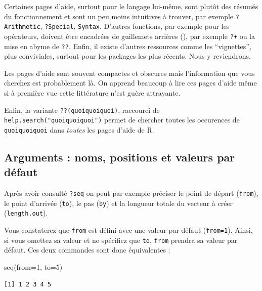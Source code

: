 \documentclass[
  letterpaper,
  DIV=11,
  numbers=noendperiod]{scrreprt}
\newenvironment{Shaded}{\begin{snugshade}}{\end{snugshade}}
\newcommand{\AttributeTok}[1]{\textcolor[rgb]{0.40,0.45,0.13}{#1}}
\newcommand{\DecValTok}[1]{\textcolor[rgb]{0.68,0.00,0.00}{#1}}
\newcommand{\FunctionTok}[1]{\textcolor[rgb]{0.28,0.35,0.67}{#1}}
\newcommand{\NormalTok}[1]{\textcolor[rgb]{0.00,0.23,0.31}{#1}}
\begin{document}
Certaines pages d'aide, surtout pour le langage lui-même, sont plutôt
des résumés du fonctionnement et sont un peu moins intuitives à trouver,
par exemple \texttt{?Arithmetic}, \texttt{?Special}, \texttt{Syntax}.
D'autres fonctions, par exemple pour les opérateurs, doivent être
encadrées de guillemets arrières (\texttt{\textasciigrave{}}), par
exemple \texttt{?\textasciigrave{}+\textasciigrave{}} ou la mise en
abyme de \texttt{?\textasciigrave{}?\textasciigrave{}}. Enfin, il existe
d'autres ressources comme les ``vignettes'', plus conviviales, surtout
pour les packages les plus récents. Nous y reviendrons.

Les pages d'aide sont souvent compactes et obscures mais l'information
que vous cherchez est probablement là. On apprend beaucoup à lire ces
pages d'aide même si à première vue cette littérature n'est guère
attrayante.

Enfin, la variante \texttt{??(quoiquoiquoi)}, raccourci de
\texttt{help.search("quoiquoiquoi")} permet de chercher toutes les
occurences de \texttt{quoiquoiquoi} dans \emph{toutes} les pages d'aide
de R.

\hypertarget{arguments-noms-positions-et-valeurs-par-duxe9faut}{%
\subsection{Arguments : noms, positions et valeurs par
défaut}\label{arguments-noms-positions-et-valeurs-par-duxe9faut}}

Après avoir consulté \texttt{?seq} on peut par exemple préciser le point
de départ (\texttt{from}), le point d'arrivée (\texttt{to}), le pas
(\texttt{by}) et la longueur totale du vecteur à créer
(\texttt{length.out}).

Vous constaterez que \texttt{from} est défini avec une valeur par défaut
(\texttt{from=1}). Ainsi, si vous omettez sa valeur et ne spécifiez que
\texttt{to}, \texttt{from} prendra sa valeur par défaut. Ces deux
commandes sont donc équivalentes :

\begin{Shaded}
\begin{Highlighting}[]
\FunctionTok{seq}\NormalTok{(}\AttributeTok{from=}\DecValTok{1}\NormalTok{, }\AttributeTok{to=}\DecValTok{5}\NormalTok{)}
\end{Highlighting}
\end{Shaded}

\begin{verbatim}
[1] 1 2 3 4 5
\end{verbatim}
\end{document}
